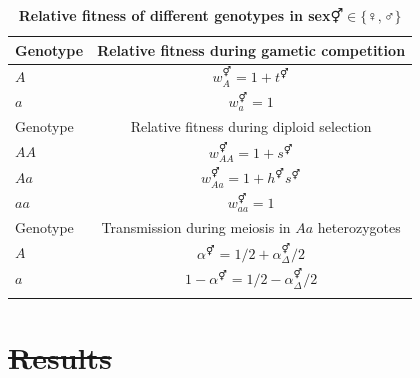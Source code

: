 \documentclass[10pt,letterpaper]{article}
\providecommand{\DIFadd}[1]{{\protect\color{blue}\uwave{#1}}} %
\providecommand{\DIFdel}[1]{{\protect\color{red}\sout{#1}}}                      %
\providecommand{\DIFdelbegin}{} %
\providecommand{\DIFaddFL}[1]{\DIFadd{#1}} %
\providecommand{\DIFdelFL}[1]{\DIFdel{#1}} %
\providecommand{\DIFaddbeginFL}{} %
\providecommand{\DIFaddendFL}{} %
\providecommand{\DIFdelbeginFL}{} %
\providecommand{\DIFdelendFL}{} %
\begin{document}
\begin{table}[ht]
\smallskip
\caption{{\bf Relative fitness of different genotypes in sex\DIFdelbeginFL \DIFdelFL{$\Hermaphrodite \in \{\female,\male\}$ }\DIFdelendFL \DIFaddbeginFL \DIFaddFL{, $\circ \in \{\female,\male\}$ }\DIFaddendFL } }
\begin{tabular}{l c }
\hline\hline
  Genotype & Relative fitness during gametic competition \\ [0.5ex] \hline
  $A$ & \DIFdelbeginFL \DIFdelFL{$w_{A}^\Hermaphrodite = 1+t^\Hermaphrodite$ }\DIFdelendFL \DIFaddbeginFL \DIFaddFL{$w_{A}^\circ = 1+t^\circ$ }\DIFaddendFL \\
  $a$ & \DIFdelbeginFL \DIFdelFL{$w_{a}^\Hermaphrodite = 1$ }\DIFdelendFL \DIFaddbeginFL \DIFaddFL{$w_{a}^\circ = 1$ }\DIFaddendFL \\ [0.5ex] \hline
  Genotype & Relative fitness during diploid selection \\ [0.5ex] \hline
  $AA$ & \DIFdelbeginFL \DIFdelFL{$w_{AA}^\Hermaphrodite = 1+ s^\Hermaphrodite$ }\DIFdelendFL \DIFaddbeginFL \DIFaddFL{$w_{AA}^\circ = 1+ s^\circ$ }\DIFaddendFL \\
  $Aa$ & \DIFdelbeginFL \DIFdelFL{$w_{Aa}^\Hermaphrodite = 1+h^\Hermaphrodite s^\Hermaphrodite$ }\DIFdelendFL \DIFaddbeginFL \DIFaddFL{$w_{Aa}^\circ = 1+h^\circ s^\circ$ }\DIFaddendFL \\
  $aa$ & \DIFdelbeginFL \DIFdelFL{$w_{aa}^\Hermaphrodite = 1$ }\DIFdelendFL \DIFaddbeginFL \DIFaddFL{$w_{aa}^\circ = 1$ }\DIFaddendFL \\ [0.5ex] \hline
  Genotype & Transmission during meiosis in $Aa$ heterozygotes \\ [0.5ex] \hline
  $A$ & \DIFdelbeginFL \DIFdelFL{$\alpha^\Hermaphrodite=1/2+\alpha_{\Delta}^{\Hermaphrodite}/2$ }\DIFdelendFL \DIFaddbeginFL \DIFaddFL{$\alpha^\circ=1/2+\alpha_{\Delta}^{\circ}/2$ }\DIFaddendFL \\
  $a$ & \DIFdelbeginFL \DIFdelFL{$1-\alpha^\Hermaphrodite=1/2-\alpha_{\Delta}^{\Hermaphrodite}/2$ }\DIFdelendFL \DIFaddbeginFL \DIFaddFL{$1-\alpha^\circ=1/2-\alpha_{\Delta}^{\circ}/2$ }\DIFaddendFL \\
  \hline \hline
  \label{tab:fitnesstable}
 \end{tabular}
\end{table}

\DIFdelbegin \section*{\DIFdel{Results}}
\end{document}
